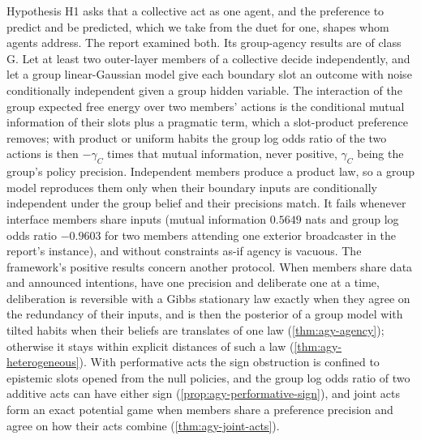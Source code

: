 Hypothesis H1 asks that a collective act as one agent, and the preference to predict and be predicted, which we take from the duet for one, shapes whom agents address. The report examined both. Its group-agency results are of class G. Let at least two outer-layer members of a collective decide independently, and let a group linear-Gaussian model give each boundary slot an outcome with noise conditionally independent given a group hidden variable. The interaction of the group expected free energy over two members' actions is the conditional mutual information of their slots plus a pragmatic term, which a slot-product preference removes; with product or uniform habits the group log odds ratio of the two actions is then $-\gamma_C$ times that mutual information, never positive, $\gamma_C$ being the group's policy precision. Independent members produce a product law, so a group model reproduces them only when their boundary inputs are conditionally independent under the group belief and their precisions match. It fails whenever interface members share inputs (mutual information $0.5649$ nats and group log odds ratio $-0.9603$ for two members attending one exterior broadcaster in the report's instance), and without constraints as-if agency is vacuous. The framework's positive results concern another protocol. When members share data and announced intentions, have one precision and deliberate one at a time, deliberation is reversible with a Gibbs stationary law exactly when they agree on the redundancy of their inputs, and is then the posterior of a group model with tilted habits when their beliefs are translates of one law (\cref{thm:agy-agency}); otherwise it stays within explicit distances of such a law (\cref{thm:agy-heterogeneous}). With performative acts the sign obstruction is confined to epistemic slots opened from the null policies, and the group log odds ratio of two additive acts can have either sign (\cref{prop:agy-performative-sign}), and joint acts form an exact potential game when members share a preference precision and agree on how their acts combine (\cref{thm:agy-joint-acts}).

